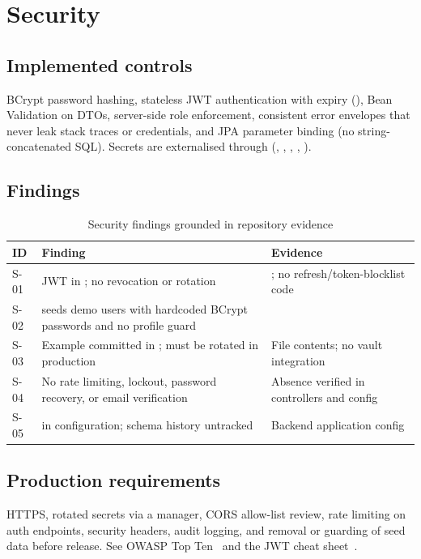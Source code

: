\section{Security}
\label{sec:security}

\subsection{Implemented controls}

BCrypt password hashing, stateless JWT authentication with expiry (), Bean Validation on DTOs, server-side role enforcement, consistent error envelopes that never leak stack traces or credentials, and JPA parameter binding (no string-concatenated SQL). Secrets are externalised through  (, , , , ).

\subsection{Findings}

\begin{table}[H]
\centering
\caption{Security findings grounded in repository evidence}
\label{tab:sec-findings}
\begin{tabular}{@{}L{2.2cm}L{5.4cm}L{6.6cm}@{}}
\toprule
\textbf{ID} & \textbf{Finding} & \textbf{Evidence} \\
\midrule
S-01 & JWT in ; no revocation or rotation & ; no refresh/token-blocklist code \\
S-02 &  seeds demo users with hardcoded BCrypt passwords and no profile guard &  \\
S-03 & Example  committed in ; must be rotated in production & File contents; no vault integration \\
S-04 & No rate limiting, lockout, password recovery, or email verification & Absence verified in controllers and config \\
S-05 &  in configuration; schema history untracked & Backend application config \\
\bottomrule
\end{tabular}
\end{table}

\subsection{Production requirements}

HTTPS, rotated secrets via a manager, CORS allow-list review, rate limiting on auth endpoints, security headers, audit logging, and removal or guarding of seed data before release. See OWASP Top Ten~\cite{owasp} and the JWT cheat sheet~\cite{owaspjwt}.
